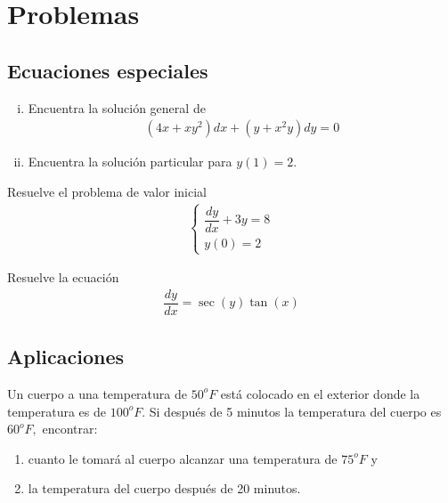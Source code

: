 \section{Problemas}

\subsection{Ecuaciones especiales}

\begin{problema}
	\begin{enumerate}[(i)]
		\item Encuentra la solución general de
		\begin{align*}
			\left( 4x+xy^{2} \right)dx+\left( y+x^{2}y \right)dy = 0
		\end{align*}

		\item Encuentra la solución particular para $y(1)=2$.
	\end{enumerate}
\end{problema}

\begin{problema}
	Resuelve el problema de valor inicial
\begin{align*}
	\begin{cases}
		\dfrac{dy}{dx}+3y=8 \\
		y(0)=2
	\end{cases}
\end{align*}
\end{problema}

\begin{problema}
	Resuelve la ecuación
	\begin{align*}
		\dfrac{dy}{dx} = \sec(y)\tan(x)
	\end{align*}
\end{problema}

\subsection{Aplicaciones}


\begin{problema}
	Un cuerpo a una temperatura de $50^{o}F$ está colocado en el exterior donde la temperatura es de $100^{o}F.$ Si después de 5 minutos la temperatura del cuerpo es $60^{o}F,$ encontrar:
	\begin{enumerate}
		\item cuanto le tomará al cuerpo alcanzar una temperatura de $75^{o}F$ y
		\item la temperatura del cuerpo después de 20 minutos.
	\end{enumerate}

\end{problema}

